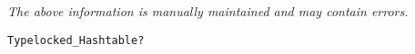 \label{pkg:int\_hashtable}

{\tiny \it The above information is manually maintained and may contain errors.}
\begin{verbatim}
Typelocked_Hashtable?
\end{verbatim}
